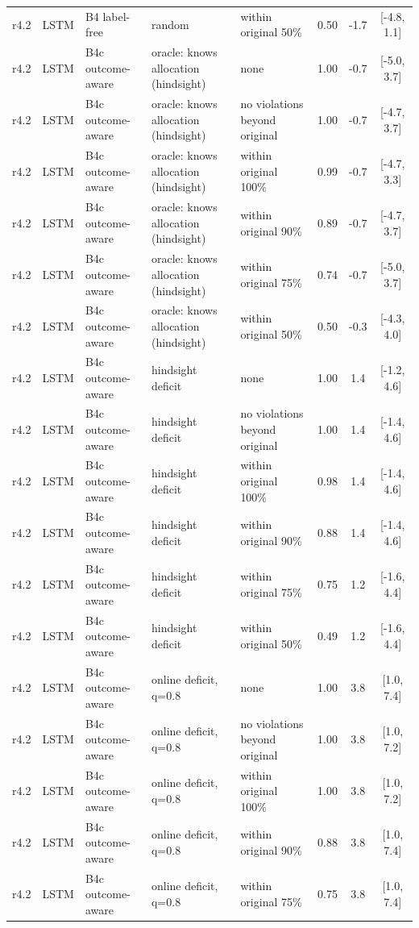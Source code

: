 \documentclass[10pt,onecolumn,letterpaper]{article}
\begin{document}
\begin{longtable}{lllp{4.2cm}p{3.4cm}ccc}
r4.2 & LSTM & B4 label-free & random & within original 50\% & 0.50 & -1.7 & [-4.8, 1.1] \\
r4.2 & LSTM & B4c outcome-aware & oracle: knows allocation (hindsight) & none & 1.00 & -0.7 & [-5.0, 3.7] \\
r4.2 & LSTM & B4c outcome-aware & oracle: knows allocation (hindsight) & no violations beyond original & 1.00 & -0.7 & [-4.7, 3.7] \\
r4.2 & LSTM & B4c outcome-aware & oracle: knows allocation (hindsight) & within original 100\% & 0.99 & -0.7 & [-4.7, 3.3] \\
r4.2 & LSTM & B4c outcome-aware & oracle: knows allocation (hindsight) & within original 90\% & 0.89 & -0.7 & [-4.7, 3.7] \\
r4.2 & LSTM & B4c outcome-aware & oracle: knows allocation (hindsight) & within original 75\% & 0.74 & -0.7 & [-5.0, 3.7] \\
r4.2 & LSTM & B4c outcome-aware & oracle: knows allocation (hindsight) & within original 50\% & 0.50 & -0.3 & [-4.3, 4.0] \\
r4.2 & LSTM & B4c outcome-aware & hindsight deficit & none & 1.00 & 1.4 & [-1.2, 4.6] \\
r4.2 & LSTM & B4c outcome-aware & hindsight deficit & no violations beyond original & 1.00 & 1.4 & [-1.4, 4.6] \\
r4.2 & LSTM & B4c outcome-aware & hindsight deficit & within original 100\% & 0.98 & 1.4 & [-1.4, 4.6] \\
r4.2 & LSTM & B4c outcome-aware & hindsight deficit & within original 90\% & 0.88 & 1.4 & [-1.4, 4.6] \\
r4.2 & LSTM & B4c outcome-aware & hindsight deficit & within original 75\% & 0.75 & 1.2 & [-1.6, 4.4] \\
r4.2 & LSTM & B4c outcome-aware & hindsight deficit & within original 50\% & 0.49 & 1.2 & [-1.6, 4.4] \\
r4.2 & LSTM & B4c outcome-aware & online deficit, q=0.8 & none & 1.00 & 3.8 & [1.0, 7.4] \\
r4.2 & LSTM & B4c outcome-aware & online deficit, q=0.8 & no violations beyond original & 1.00 & 3.8 & [1.0, 7.2] \\
r4.2 & LSTM & B4c outcome-aware & online deficit, q=0.8 & within original 100\% & 1.00 & 3.8 & [1.0, 7.2] \\
r4.2 & LSTM & B4c outcome-aware & online deficit, q=0.8 & within original 90\% & 0.88 & 3.8 & [1.0, 7.4] \\
r4.2 & LSTM & B4c outcome-aware & online deficit, q=0.8 & within original 75\% & 0.75 & 3.8 & [1.0, 7.4] \\

\end{longtable}
\end{document}
